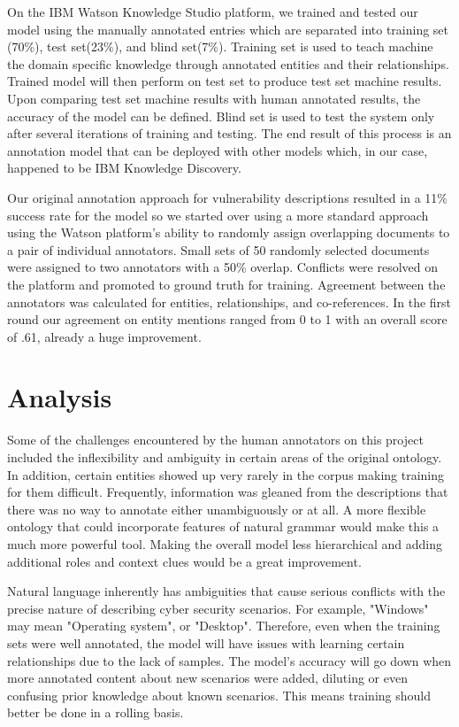 \documentclass{article} %
\begin{document}
On the IBM Watson Knowledge Studio platform, we trained and tested our model using the manually annotated entries which are separated into training set (70\%), test set(23\%), and blind set(7\%). Training set is used to teach machine the domain specific knowledge through annotated entities and their relationships. Trained model will then perform on test set to produce test set machine results. Upon comparing test set machine results with human annotated results, the accuracy of the model can be defined. Blind set is used to test the system only after several iterations of training and testing. The end result of this process is an annotation model that can be deployed with other models which, in our case, happened to be IBM Knowledge Discovery.

Our original annotation approach for vulnerability descriptions resulted in a 11\% success rate for the model so we started over using a more standard approach using the Watson platform's ability to randomly assign overlapping documents to a pair of individual annotators.  Small sets of 50 randomly selected documents were assigned to two annotators with a 50\% overlap.  Conflicts were resolved on the platform and promoted to ground truth for training.  Agreement between the annotators was calculated for entities, relationships, and co-references.  In the first round our agreement on entity mentions ranged from 0 to 1 with an overall score of .61, already a huge improvement.

\section{Analysis}
Some of the challenges encountered by the human annotators on this project included the inflexibility and ambiguity in certain areas of the original ontology.  In addition, certain entities showed up very rarely in the corpus making training for them difficult.  Frequently, information was gleaned from the descriptions that there was no way to annotate either unambiguously or at all.  A more flexible ontology that could incorporate features of natural grammar would make this a much more powerful tool.  Making the overall model less hierarchical and adding additional roles and context clues would be a great improvement.

Natural language inherently has ambiguities that cause serious conflicts with the precise nature of describing cyber security scenarios. For example, "Windows" may mean "Operating system", or "Desktop". Therefore, even when the training sets were well annotated, the model will have issues with learning certain relationships due to the lack of samples. The model's accuracy will go down when more annotated content about new scenarios were added, diluting or even confusing prior knowledge about known scenarios. This means training should better be done in a rolling basis.
\end{document}
